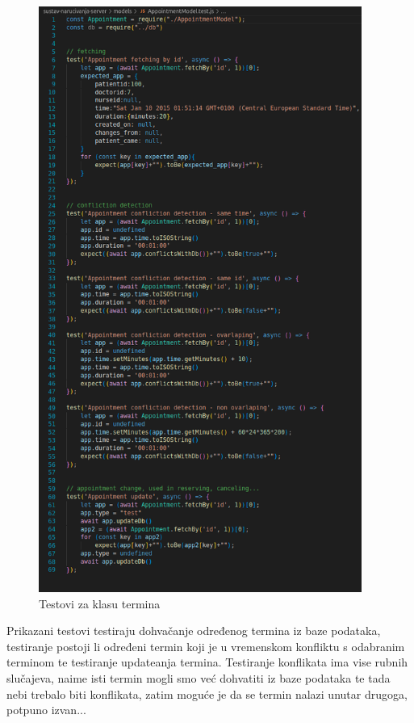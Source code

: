             \begin{figure}[H]
                    \includegraphics[width=300pt]{slike/appointment_tests_code.png} %
                    \caption{Testovi za klasu termina}
                    \label{fig:test3} %
                \end{figure}
                Prikazani testovi testiraju dohvačanje određenog termina iz baze podataka, testiranje postoji li određeni termin koji je u vremenskom konfliktu s odabranim terminom te testiranje updateanja termina. Testiranje konflikata ima vise rubnih slučajeva, naime isti termin mogli smo već dohvatiti iz baze podataka te tada nebi trebalo biti konflikata, zatim moguće je da se termin nalazi unutar drugoga, potpuno izvan...

